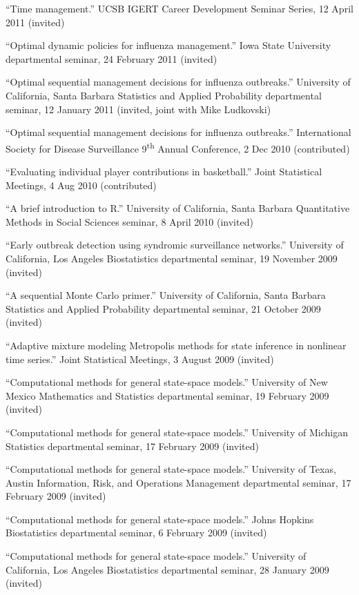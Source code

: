 \documentclass[overlapped,line,letterpaper]{res}
\begin{document}
\begin{resume}
{``Time management.'' UCSB IGERT Career Development Seminar Series, 12 April 2011 (invited)

``Optimal dynamic policies for influenza management.'' Iowa State University departmental seminar, 24 February 2011 (invited)

``Optimal sequential management decisions for influenza outbreaks.'' University of California, Santa Barbara Statistics and Applied Probability departmental seminar, 12 January 2011 (invited, joint with Mike Ludkovski)

``Optimal sequential management decisions for influenza outbreaks.'' International Society for Disease Surveillance 9\textsuperscript{th} Annual Conference, 2 Dec 2010 (contributed)

``Evaluating individual player contributions in basketball.'' Joint Statistical Meetings, 4 Aug 2010 (contributed)

``A brief introduction to R.'' University of California, Santa Barbara Quantitative Methods in Social Sciences seminar, 8 April 2010 (invited)

``Early outbreak detection using syndromic surveillance networks.'' University of California, Los Angeles Biostatistics departmental seminar, 19 November 2009 (invited)

``A sequential Monte Carlo primer.'' University of California, Santa Barbara Statistics and Applied Probability departmental seminar, 21 October 2009 (invited)

``Adaptive mixture modeling Metropolis methods for state inference in nonlinear time series.'' Joint Statistical Meetings, 3 August 2009 (invited)

``Computational methods for general state-space models.'' University of New Mexico Mathematics and Statistics departmental seminar, 19 February 2009 (invited)

``Computational methods for general state-space models.'' University of Michigan Statistics departmental seminar, 17 February 2009 (invited)

``Computational methods for general state-space models.'' University of Texas, Austin Information, Risk, and Operations Management departmental seminar, 17 February 2009 (invited)

``Computational methods for general state-space models.'' Johns Hopkins Biostatistics departmental seminar, 6 February 2009 (invited)

``Computational methods for general state-space models.'' University of California, Los Angeles Biostatistics departmental seminar, 28 January 2009 (invited)

}
\end{resume}
\end{document}
